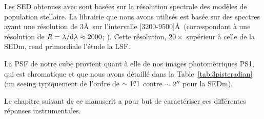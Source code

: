 \documentclass[../main/main.tex]{subfiles}
\begin{document}
Les SED obtenues avec
\cigale sont basées sur la résolution spectrale des modèles de
population stellaire. La librairie  que nous avons utilisés
est basée sur des spectres ayant une résolution de $3$\AA\ sur
l'intervalle [$3200$-$9500$]\AA\ (correspondant à une résolution de
$R=\lambda/\mathrm{d}\lambda\approx2000$; \citet{BCO3}). Cette résolution,
$20\times$ supérieur à celle de la SEDm, rend primordiale l'étude la
LSF.

La PSF de notre cube provient quant à elle de nos images
photométriques PS1, qui est chromatique et que nous avons détaillé dans
la Table~\ref{tab:3pisteradian} (un seeing typiquement de l'ordre de
$\sim1\overset{\prime\prime}{.}1$ contre $\sim2^{\prime\prime}$ pour la SEDm).

Le chapitre suivant de
ce manuscrit a pour but de caractériser ces différentes réponses
instrumentales.

%
%
\end{document}
